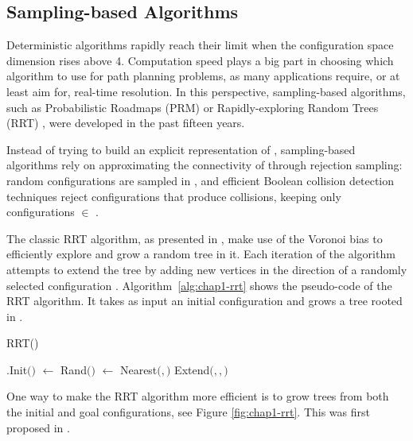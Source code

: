 \subsection{Sampling-based Algorithms}
\label{subsec:chap1-sampling-algorithms}

Deterministic algorithms rapidly reach their limit when the
configuration space dimension rises above 4. Computation speed plays a
big part in choosing which algorithm to use for path planning
problems, as many applications require, or at least aim for, real-time
resolution. In this perspective, sampling-based algorithms, such as
Probabilistic Roadmaps (PRM) \cite{kavr96} or Rapidly-exploring Random
Trees (RRT) \cite{kuff00}, were developed in the past fifteen years.

Instead of trying to build an explicit representation of {\cfree},
sampling-based algorithms rely on approximating the connectivity of
{\cfree} through rejection sampling: random configurations 
are sampled in {\cspace}, and efficient Boolean collision detection
techniques \cite{huds97, gott96} reject configurations that produce
collisions, keeping only configurations \config{} $\in$ {\cfree}.

The classic RRT algorithm, as presented in \cite{kuff00}, make use of
the Voronoi bias to efficiently explore {\cfree} and grow a random tree
in it. Each iteration of the algorithm attempts to extend the tree by
adding new vertices in the direction of a randomly selected
configuration . Algorithm~\ref{alg:chap1-rrt} shows the
pseudo-code of the RRT algorithm. It takes as input an initial
configuration  and grows a tree {\ctree} rooted in .

\begin{algorithm}
\caption{RRT()}
\label{alg:chap1-rrt}
\begin{algorithmic}
\STATE {\ctree}$.$Init$($$)$
\STATE {} $ \leftarrow $ Rand$(${\cspace}$)$
\STATE {}$ \leftarrow $ Nearest$($$,${\ctree}$)$
\STATE Extend$(${\ctree}$,$$,$$)$
\ENDFOR
\end{algorithmic}
\end{algorithm}

One way to make the RRT algorithm more efficient is to grow trees from
both the initial and goal configurations, see Figure
\ref{fig:chap1-rrt}. This was first proposed in \cite{kuff00}.


